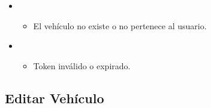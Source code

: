 \documentclass[a4paper,11pt,spanish]{sphinxmanual}
\begin{document}
\begin{fulllineitems}
\begin{itemize}
\item {} 
\sphinxAtStartPar
{}
\begin{itemize}
\item {} 
\sphinxAtStartPar
El vehículo no existe o no pertenece al usuario.

\end{itemize}

\begin{sphinxVerbatim}[commandchars=\\\{\}]
\end{sphinxVerbatim}

\item {} 
\sphinxAtStartPar
{}
\begin{itemize}
\item {} 
\sphinxAtStartPar
Token inválido o expirado.

\end{itemize}

\end{itemize}

\end{fulllineitems}



\subsection{Editar Vehículo}
\label{\detokenize{endpoints:editar-vehiculo}}
\end{document}
